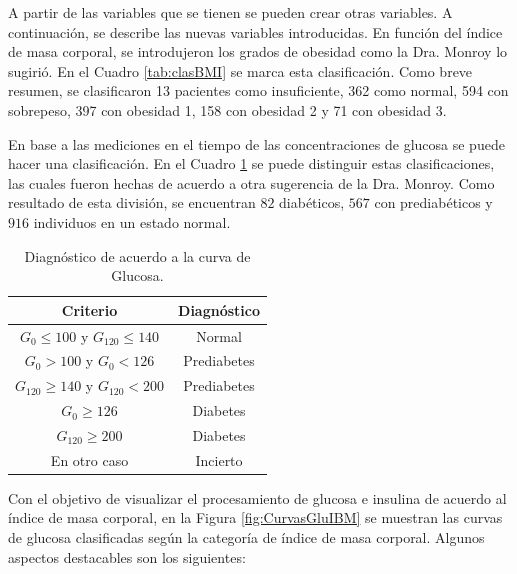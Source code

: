 A partir de las variables que se tienen se pueden crear otras variables. A continuación, se describe las nuevas variables introducidas.  En función del índice de masa corporal, se introdujeron los grados de obesidad como la Dra. Monroy lo sugirió. En el Cuadro \ref{tab:clasBMI} se marca esta clasificación.
Como breve resumen, se clasificaron 13 pacientes como insuficiente, 362 como normal, 594 con sobrepeso, 397 con obesidad 1, 158 con obesidad 2 y 71 con obesidad 3. 
 


En base a las mediciones en el tiempo de las concentraciones de glucosa se puede hacer una clasificación. En el Cuadro \ref{tab:diagnostico} se puede distinguir estas clasificaciones, las cuales fueron hechas de acuerdo a otra sugerencia de la Dra. Monroy. Como resultado de esta división, se encuentran $82$ diabéticos, $567$ con prediabéticos y $916$ individuos en un estado normal.

\begin{table}[H]
\centering
\begin{tabular}{||c|c||}
\hline\hline
\textbf{Criterio}                       & \textbf{Diagnóstico} \\ \hline\hline
$G_0 \leq100$ y $G_{120} \leq 140$   & Normal               \\ \hline
$G_{0} > 100$ y $G_{0} < 126$  & Prediabetes          \\ \hline
$G_{120} \geq 140$ y $G_{120} < 200$ & Prediabetes          \\ \hline
$G_0 \geq 126$                     & Diabetes             \\ \hline
$G_{120} \geq 200$                  & Diabetes             \\ \hline
En otro caso                            & Incierto              \\ \hline\hline
\end{tabular}
\caption{Diagnóstico de acuerdo a la curva de Glucosa.}
\label{tab:diagnostico}
\end{table}

Con el objetivo de visualizar el procesamiento de glucosa e insulina de acuerdo al índice de masa corporal, en la Figura \ref{fig:CurvasGluIBM} se muestran las curvas de glucosa clasificadas según la categoría de índice de masa corporal. Algunos aspectos destacables son los siguientes: 

